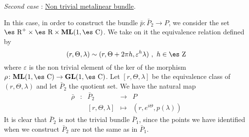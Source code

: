 \documentclass[12pt]{article}
\def\Zahl{\mbox{\es Z}}
\def\Real{\mbox{\es R}}
\def\Complex{\mbox{\es C}}
\begin{document}
{\it Second case \/}: \underline{ Non trivial metalinear bundle}.

In this case, in order to construct the bundle
$\bar p \colon \bar P_2 \to P$, we consider the set
$\Real^+ \times \Real \times {\bf ML}(1,\Complex )$.
We take on it the equivalence relation defined by
$$
(r,\Theta ,\lambda ) \sim (r,\Theta +2\pi h,\varepsilon^h\lambda )
\ , \ h \in \Zahl
$$
where $\varepsilon$ is the non trivial element
of the ker of the morphism
$\rho \colon {\bf ML}(1,\Complex ) \to {\bf GL}(1,\Complex )$.
Let $[r,\Theta ,\lambda ]$ be the equivalence class of
$(r,\Theta ,\lambda )$ and let $\bar P_2$ the quotient set.
We have the natural map
$$
\begin{array}{ccccc}
\bar \rho & \colon & \bar P_2 & \rightarrow & P
\\
& & [r,\Theta ,\lambda ] & \mapsto & (r,e^{i\Theta},p(\lambda ))
\end{array}
$$
It is clear that $\bar P_2$ is not
the trivial bundle $\bar P_1$,
since the points we have identified when we construct
$\bar P_2$ are not the same as in $\bar P_1$.
\end{document}
